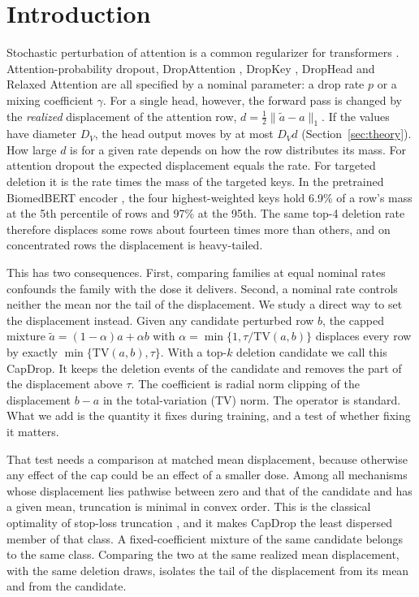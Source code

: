 \section{Introduction}\label{sec:intro}

Stochastic perturbation of attention is a common regularizer for transformers
\citep{vaswani2017attention}. Attention-probability dropout, DropAttention \citep{lin2019dropattention},
DropKey \citep{li2023dropkey}, DropHead \citep{zhou2020drophead} and Relaxed Attention
\citep{lohrenz2021relaxed,lohrenz2023relaxed} are all specified by a nominal parameter: a drop rate $p$
or a mixing coefficient $\gamma$. For a single head, however, the forward pass is changed by the
\emph{realized} displacement of the attention row, $d=\tfrac12\lVert\tilde a-a\rVert_1$. If the values
have diameter $D_V$, the head output moves by at most $D_V d$ (Section~\ref{sec:theory}). How large $d$ is
for a given rate depends on how the row distributes its mass. For attention dropout the expected
displacement equals the rate. For targeted deletion it is the rate times the mass of the targeted keys.
In the pretrained BiomedBERT encoder \citep{gu2021domain}, the four highest-weighted keys hold
6.9\% of a row's mass at the 5th percentile of rows and 97\% at the 95th. The same top-4 deletion rate
therefore displaces some rows about fourteen times more than others, and on concentrated rows the displacement
is heavy-tailed.

This has two consequences. First, comparing families at equal nominal rates confounds the family with
the dose it delivers. Second, a nominal rate controls neither the mean nor the tail of the displacement.
We study a direct way to set the displacement instead. Given any candidate perturbed row $b$, the
capped mixture $\tilde a=(1-\alpha)a+\alpha b$ with $\alpha=\min\{1,\tau/\mathrm{TV}(a,b)\}$ displaces
every row by exactly $\min\{\mathrm{TV}(a,b),\tau\}$. With a top-$k$ deletion candidate we call this
CapDrop. It keeps the deletion events of the candidate and removes the part of the displacement above $\tau$.
The coefficient is radial norm clipping \citep{koloskova2023revisiting} of the displacement $b-a$ in the
total-variation (TV) norm. The operator is standard. What we add is the quantity it fixes during
training, and a test of whether fixing it matters.

That test needs a comparison at matched mean displacement, because otherwise any effect of the cap
could be an effect of a smaller dose. Among all mechanisms whose displacement lies pathwise between
zero and that of the candidate and has a given mean, truncation is minimal in convex order. This is
the classical optimality of stop-loss truncation \citep{ohlin1969class,kaas2008modern}, and it makes
CapDrop the least dispersed member of that class. A fixed-coefficient mixture of the same candidate
belongs to the same class. Comparing the two at the same realized mean displacement, with the same
deletion draws, isolates the tail of the displacement from its mean and from the candidate.

